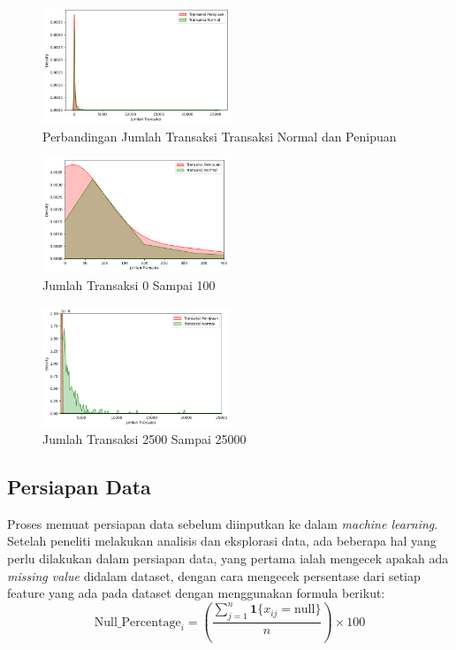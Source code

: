 \begin{figure}[H]
	\centering
	\includegraphics[width=0.5\textwidth]{figure/jumlah transaksi.png}
	\caption{Perbandingan Jumlah Transaksi Transaksi Normal dan Penipuan}
	\label{fig:3.Perbandingan Jumlah Transaksi Transaksi Normal dan Penipuan}
\end{figure}
\begin{figure}[H]
	\centering
	\includegraphics[width=0.5\textwidth]{figure/nolsampaiseratus.png}
	\caption{Jumlah Transaksi 0 Sampai 100}
	\label{fig:3.Jumlah Transaksi 0 Sampai 100}
\end{figure}
\begin{figure}[H]
	\centering
	\includegraphics[width=0.5\textwidth]{figure/jumlahtransaksiduaribulimaratus.png}
	\caption{Jumlah Transaksi 2500 Sampai 25000}
	\label{fig:3.Jumlah Transaksi 2500 Sampai 25000}
\end{figure}

\subsection{Persiapan Data}
Proses memuat persiapan data sebelum diinputkan ke dalam \textit{machine learning}. Setelah peneliti melakukan analisis dan eksplorasi data, ada beberapa hal yang perlu dilakukan dalam persiapan data, yang pertama ialah mengecek apakah ada \textit{missing value} didalam dataset, dengan cara mengecek persentase dari setiap feature yang ada pada dataset dengan menggunakan formula berikut:\\
\begin{equation}
\text{Null\_Percentage}_i = \left( \frac{\sum_{j=1}^{n} \mathbf{1} \{ x_{ij} = \text{null} \}}{n} \right) \times 100
\end{equation}

